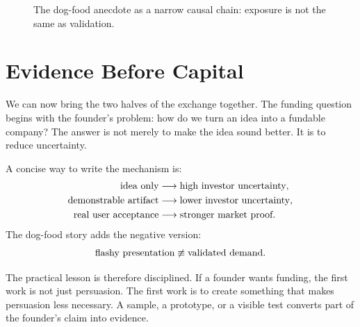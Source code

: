 \begin{figure}
\centering
{}
\caption{The dog-food anecdote as a narrow causal chain: exposure is not the same as validation.}
\end{figure}

\section{Evidence Before Capital}

We can now bring the two halves of the exchange together. The funding question begins with the founder's problem: how do we turn an idea into a fundable company? The answer is not merely to make the idea sound better. It is to reduce uncertainty.

A concise way to write the mechanism is:
\begin{align}
\hbox{idea only} &\longrightarrow \hbox{high investor uncertainty},\\
\hbox{demonstrable artifact} &\longrightarrow \hbox{lower investor uncertainty},\\
\hbox{real user acceptance} &\longrightarrow \hbox{stronger market proof}.
\end{align}
The dog-food story adds the negative version:
\begin{equation}
\hbox{flashy presentation} \not\equiv \hbox{validated demand}.
\end{equation}

The practical lesson is therefore disciplined. If a founder wants funding, the first work is not just persuasion. The first work is to create something that makes persuasion less necessary. A sample, a prototype, or a visible test converts part of the founder's claim into evidence.

